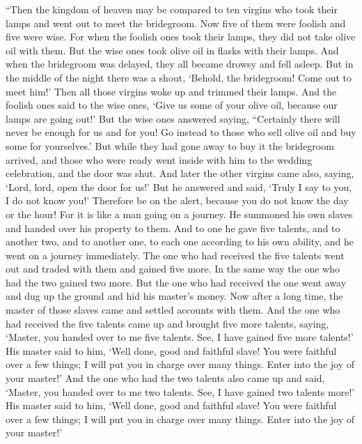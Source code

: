 \begin{biblechapter} %
 “Then the kingdom of heaven may be compared to ten virgins who took their lamps and went out to meet the bridegroom.
\verse Now five of them were foolish and five were wise.
\verse For when the foolish ones took their lamps, they did not take olive oil with them.
\verse But the wise ones took olive oil in flasks with their lamps.
\verse And when the bridegroom was delayed, they all became drowsy and fell asleep.
\verse But in the middle of the night there was a shout, ‘Behold, the bridegroom! Come out to meet him!’
\verse Then all those virgins woke up and trimmed their lamps.
\verse And the foolish ones said to the wise ones, ‘Give us some of your olive oil, because our lamps are going out!’
\verse But the wise ones answered saying, “Certainly there will never be enough for us and for you! Go instead to those who sell olive oil and buy some for yourselves.’
\verse But while they had gone away to buy it the bridegroom arrived, and those who were ready went inside with him to the wedding celebration, and the door was shut.
\verse And later the other virgins came also, saying, ‘Lord, lord, open the door for us!’
\verse But he answered and said, ‘Truly I say to you, I do not know you!’
\verse Therefore be on the alert, because you do not know the day or the hour!
 For it is like a man going on a journey. He summoned his own slaves and handed over his property to them.
\verse And to one he gave five talents, and to another two, and to another one, to each one according to his own ability, and he went on a journey immediately.
\verse The one who had received the five talents went out and traded with them and gained five more.
\verse In the same way the one who had the two gained two more.
\verse But the one who had received the one went away and dug up the ground and hid his master’s money.
\verse Now after a long time, the master of those slaves came and settled accounts with them.
\verse And the one who had received the five talents came up and brought five more talents, saying, ‘Master, you handed over to me five talents. See, I have gained five more talents!’
\verse His master said to him, ‘Well done, good and faithful slave! You were faithful over a few things; I will put you in charge over many things. Enter into the joy of your master!’
\verse And the one who had the two talents also came up and said, ‘Master, you handed over to me two talents. See, I have gained two talents more!’
\verse His master said to him, ‘Well done, good and faithful slave! You were faithful over a few things; I will put you in charge over many things. Enter into the joy of your master!’

\end{biblechapter}
